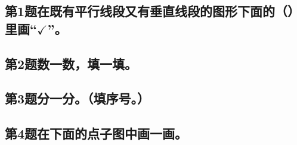 \subsection*{第1题\quad 在既有平行线段又有垂直线段的图形下面的（\quad）里画“$\checkmark$”。}
\subsection*{第2题\quad 数一数，填一填。}
\subsection*{第3题\quad 分一分。（填序号。）}
\subsection*{第4题\quad 在下面的点子图中画一画。}
